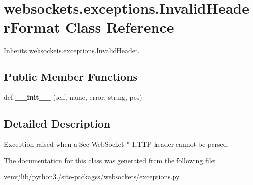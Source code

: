 \hypertarget{classwebsockets_1_1exceptions_1_1_invalid_header_format}{}\section{websockets.\+exceptions.\+Invalid\+Header\+Format Class Reference}
\label{classwebsockets_1_1exceptions_1_1_invalid_header_format}


Inherits \hyperlink{classwebsockets_1_1exceptions_1_1_invalid_header}{websockets.\+exceptions.\+Invalid\+Header}.

\subsection*{Public Member Functions}
\begin{DoxyCompactItemize}
\item 
\mbox{\label{classwebsockets_1_1exceptions_1_1_invalid_header_format_a089aa434f440e0ebc1e5391b96eeb685}} 
def {\bfseries \+\_\+\+\_\+init\+\_\+\+\_\+} (self, name, error, string, pos)
\end{DoxyCompactItemize}


\subsection{Detailed Description}
\begin{DoxyVerb}Exception raised when a Sec-WebSocket-* HTTP header cannot be parsed.\end{DoxyVerb}
 

The documentation for this class was generated from the following file\+:\begin{DoxyCompactItemize}
\item 
venv/lib/python3./site-\/packages/websockets/exceptions.\+py\end{DoxyCompactItemize}
